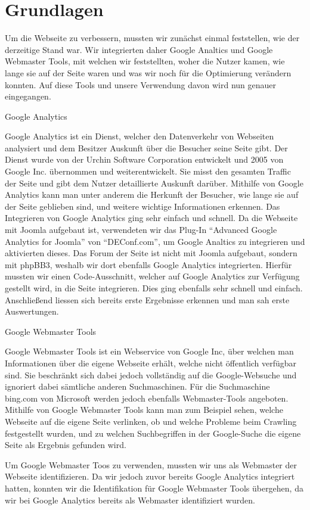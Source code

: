 \chapter{Grundlagen}

Um die Webseite zu verbessern, mussten wir zunächst einmal feststellen, wie der derzeitige Stand war. Wir integrierten daher Google Analtics und Google Webmaster Tools, mit welchen wir feststellten, woher die Nutzer kamen, wie lange sie auf der Seite waren und was wir noch für die Optimierung verändern konnten. Auf diese Tools und unsere Verwendung davon wird nun genauer eingegangen.

Google Analytics

Google Analytics ist ein Dienst, welcher den Datenverkehr von Webseiten analysiert und dem Besitzer Auskunft über die Besucher seine Seite gibt. Der Dienst wurde von der Urchin Software Corporation entwickelt und 2005 von Google Inc. übernommen und weiterentwickelt.
Sie misst den gesamten Traffic der Seite und gibt dem Nutzer detaillierte Auskunft darüber.
Mithilfe von Google Analytics kann man unter anderem die Herkunft der Besucher, wie lange sie auf der Seite geblieben sind, und weitere wichtige Informationen erkennen.
Das Integrieren von Google Analytics ging sehr einfach und schnell. Da die Webseite mit Joomla aufgebaut ist, verwendeten wir das Plug-In “Advanced Google Analytics for Joomla” von “DEConf.com”, um Google Analtics zu integrieren und aktivierten dieses. 
Das Forum der Seite ist nicht mit Joomla aufgebaut, sondern mit phpBB3, weshalb wir dort ebenfalls Google Analytics integrierten. Hierfür mussten wir einen Code-Ausschnitt, welcher auf Google Analytics zur Verfügung gestellt wird, in die Seite integrieren. Dies ging ebenfalls sehr schnell und einfach.
Anschließend liessen sich bereits erste Ergebnisse erkennen und man sah erste Auswertungen.


Google Webmaster Tools

Google Webmaster Tools ist ein Webservice von Google Inc, über welchen man Informationen über die eigene Webseite erhält, welche nicht öffentlich verfügbar sind. 
Sie beschränkt sich dabei jedoch vollständig auf die Google-Websuche und ignoriert dabei sämtliche anderen Suchmaschinen. Für die Suchmaschine bing.com von Microsoft werden jedoch ebenfalls Webmaster-Tools angeboten.
Mithilfe von Google Webmaster Tools kann man zum Beispiel sehen, welche Webseite auf die eigene Seite verlinken, ob und welche Probleme beim Crawling festgestellt wurden, und zu welchen Suchbegriffen in der Google-Suche die eigene Seite als Ergebnis gefunden wird.

Um Google Webmaster Toos zu verwenden, mussten wir uns als Webmaster der Webseite identifizieren. Da wir jedoch zuvor bereits Google Analytics integriert hatten, konnten wir die Identifikation für Google Webmaster Tools übergehen, da wir bei Google Analytics bereits als Webmaster identifiziert wurden.

